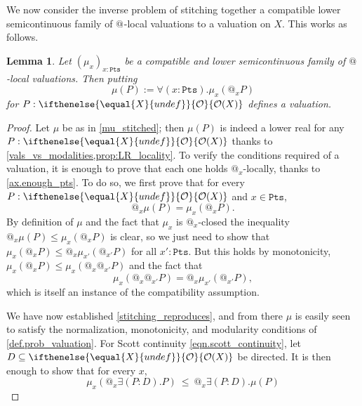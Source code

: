 \documentclass[reqno,11pt]{amsproc}
\makeatletter
\theoremstyle{plain}
\newtheorem{lemma}[theorem]{Lemma}
\theoremstyle{definition}
\newcommand{\pt}{x}
\newcommand{\Op}[1][undef]{\ifthenelse{\equal{#1}{undef}}{\mathcal{O}}{\mathcal{O}(#1)}}
\newcommand{\pts}{\mathtt{Pts}}		%
\newcommand{\atsymbol}{{@}}
\newcommand{\at}[1][\pt]{\atsymbol_{#1}}
\numberwithin{equation}{section}
\makeatother
\begin{document}
We now consider the inverse problem of stitching together a compatible lower semicontinuous family of $\at[]$-local valuations to a valuation on $X$. This works as follows.

\begin{lemma}\label{lemma.compat_lowersemi_stitched}
	Let $(\mu_\pt)_{\pt : \pts}$ be a compatible and lower semicontinuous family of $\at[]$-local valuations. Then putting
	\begin{equation}
		\label{mu_stitched}
		\mu(P) := \forall (\pt : \pts) . \mu_\pt(\at P)
	\end{equation}
	for $P : \Op[X]$ defines a valuation.
\end{lemma}

\begin{proof}
	Let $\mu$ be as in \eqref{mu_stitched}; then $\mu(P)$ is indeed a lower real for any $P:\Op[X]$ thanks to \cref{vals_vs_modalities,prop:LR_locality}. To verify the conditions required of a valuation, it is enough to prove that each one holds $\at$-locally, thanks to \cref{ax.enough_pts}. To do so, we first prove that for every $P : \Op[X]$ and $\pt\in\pts$,
	\begin{equation}
		\label{stitching_reproduces}
		\at \mu(P) = \mu_\pt(\at P).
	\end{equation}
	By definition of $\mu$ and the fact that $\mu_\pt$ is $\at$-closed the inequality $\at \mu(P) \le \mu_\pt(\at P)$ is clear, so we just need to show that $\mu_\pt(\at P) \le \at \mu_{\pt'}(\at[\pt'] P)$ for all $\pt' : \pts$. But this holds by monotonicity, $\mu_\pt(\at P)\le\mu_\pt(\at\at[\pt']P)$ and the fact that
	\[
		\mu_\pt(\at \at[\pt'] P) = \at \mu_{\pt'}(\at[\pt'] P),
	\]
	which is itself an instance of the compatibility assumption.

	We have now established \eqref{stitching_reproduces}, and from there $\mu$ is easily seen to satisfy the normalization, monotonicity, and modularity conditions of \cref{def.prob_valuation}. For Scott continuity \eqref{eqn.scott_continuity}, let $D \subseteq \Op[X]$ be directed. It is then enough to show that for every $\pt$,
	\begin{equation}
		\label{goal_continuous}
		\mu_\pt(\at \exists (P : D) . P) \: \le \: \at \exists (P : D). \mu(P)
	\end{equation}


\end{proof}
\end{document}
